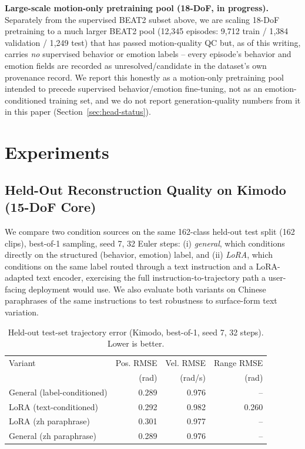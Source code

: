 \documentclass[conference]{IEEEtran}
\begin{document}
\textbf{Large-scale motion-only pretraining pool (18-DoF, in
progress).} Separately from the supervised BEAT2 subset above, we are
scaling 18-DoF pretraining to a much larger BEAT2 pool (12{,}345
episodes: 9{,}712 train / 1{,}384 validation / 1{,}249 test) that has
passed motion-quality QC but, as of this writing, carries \emph{no}
supervised behavior or emotion labels -- every episode's behavior and
emotion fields are recorded as unresolved/candidate in the dataset's
own provenance record. We report this honestly as a motion-only
pretraining pool intended to precede supervised behavior/emotion
fine-tuning, not as an emotion-conditioned training set, and we do not
report generation-quality numbers from it in this paper
(Section~\ref{sec:head-status}).

\section{Experiments}
\label{sec:experiments}

\subsection{Held-Out Reconstruction Quality on Kimodo (15-DoF Core)}
\label{sec:heldout}

We compare two condition sources on the same 162-class held-out test
split (162 clips), best-of-1 sampling, seed 7, 32 Euler steps: (i)
\emph{general}, which conditions directly on the structured
(behavior, emotion) label, and (ii) \emph{LoRA}, which conditions on
the same label routed through a text instruction and a LoRA-adapted
text encoder, exercising the full instruction-to-trajectory path a
user-facing deployment would use. We also evaluate both variants on
Chinese paraphrases of the same instructions to test robustness to
surface-form text variation.

\begin{table}[t]
\centering
\caption{Held-out test-set trajectory error (Kimodo, best-of-1, seed 7, 32 steps). Lower is better.}
\label{tab:heldout}
\begin{tabular}{@{}lrrr@{}}
\toprule
Variant & Pos. RMSE & Vel. RMSE & Range RMSE \\
 & (rad) & (rad/s) & (rad) \\
\midrule
General (label-conditioned) & 0.289 & 0.976 & -- \\
LoRA (text-conditioned) & 0.292 & 0.982 & 0.260 \\
LoRA (zh paraphrase) & 0.301 & 0.977 & -- \\
General (zh paraphrase) & 0.289 & 0.976 & -- \\
\bottomrule
\end{tabular}
\end{table}
\end{document}
